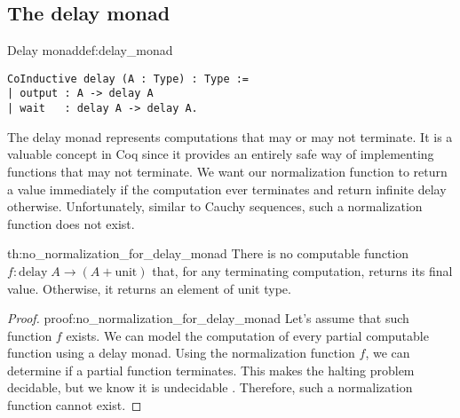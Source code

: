 \subsection{The delay monad}
\begin{defi}{Delay monad}{def:delay_monad}
\begin{verbatim}
CoInductive delay (A : Type) : Type := 
| output : A -> delay A
| wait   : delay A -> delay A.
\end{verbatim}
\end{defi}
The delay monad \cite{DelayedMonad} represents computations that may or may not terminate. It is a valuable concept in Coq since it provides an entirely safe way of implementing functions that may not terminate. We want our normalization function to return a value immediately if the computation ever terminates and return infinite delay otherwise. Unfortunately, similar to Cauchy sequences, such a normalization function does not exist.
\begin{theo}{}{th:no_normalization_for_delay_monad}
There is no computable function $f: \textrm{delay} \; A \rightarrow (A + \textrm{unit})$ that, for any terminating computation, returns its final value. Otherwise, it returns an element of unit type.
\end{theo}
\begin{proof}{}{proof:no_normalization_for_delay_monad}
Let's assume that such function $f$ exists. We can model the computation of every partial computable function using a delay monad. Using the normalization function $f$, we can determine if a partial function terminates. This makes the halting problem decidable, but we know it is undecidable \cite{Undecidable}. Therefore, such a normalization function cannot exist. \contradiction
\end{proof}
